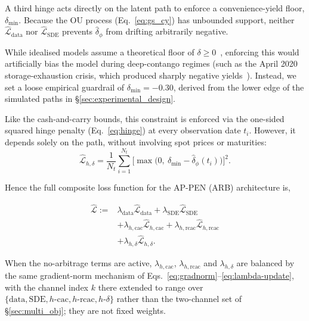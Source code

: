 \documentclass[sigconf, authorversion=true, nonacm=true]{acmart}
\begin{document}
A third hinge acts directly on the latent path to enforce a convenience-yield floor, $\delta_{\min}$. Because the OU process (Eq.~\ref{eq:gs_cy}) has unbounded support, neither $\hat{\mathcal{L}}_{\text{data}}$ nor $\hat{\mathcal{L}}_{\text{SDE}}$ prevents $\hat{\delta}_\phi$ from drifting arbitrarily negative.

While idealised models assume a theoretical floor of $\delta \geq 0$~\cite{Liu2009No-ArbitrageStructures}, enforcing this would artificially bias the model during deep-contango regimes (such as the April 2020 storage-exhaustion crisis, which produced sharply negative yields~\cite{Reuters2020, CME2020}). Instead, we set a loose empirical guardrail of $\delta_{\min} = -0.30$, derived from the lower edge of the simulated paths in \S\ref{sec:experimental_design}.

Like the cash-and-carry bounds, this constraint is enforced via the one-sided squared hinge penalty (Eq.~\ref{eq:hinge}) at every observation date $t_i$. However, it depends solely on the path, without involving spot prices or maturities:
\begin{equation}
\hat{\mathcal{L}}_{h,\delta} = \frac{1}{N_t} \sum_{i=1}^{N_t}
\Big[ \max\!\Big( 0,\ \delta_{\min} - \hat{\delta}_\phi(t_i) \Big) \Big]^2.
\label{eq:delta-floor-loss}
\end{equation}

Hence the full composite loss function for the AP-PEN (ARB) architecture is,

\begin{equation}
\begin{split}
\hat{\mathcal{L}} := {}&
\lambda_{\text{data}} \hat{\mathcal{L}}_{\text{data}}
+ \lambda_{\text{SDE}} \hat{\mathcal{L}}_{\text{SDE}} \\
&+ \lambda_{h,\text{cac}} \hat{\mathcal{L}}_{h,\text{cac}}
+ \lambda_{h,\text{rcac}} \hat{\mathcal{L}}_{h,\text{rcac}} \\
&+ \lambda_{h,\delta} \hat{\mathcal{L}}_{h,\delta}.
\end{split}
\label{eq:composite-full}
\end{equation}

When the no-arbitrage terms are active, $\lambda_{h,\text{cac}}$, $\lambda_{h,\text{rcac}}$ and $\lambda_{h,\delta}$ are balanced by the same gradient-norm mechanism of Eqs.~\ref{eq:gradnorm}--\ref{eq:lambda-update}, with the channel index $k$ there extended to range over $\{\text{data}, \text{SDE}, h\text{-cac}, h\text{-rcac}, h\text{-}\delta\}$ rather than the two-channel set of \S\ref{sec:multi_obj}; they are not fixed weights.
\end{document}
